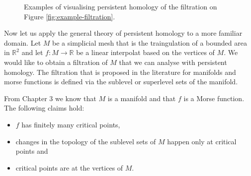 \begin{figure}[h]
    \caption{Examples of visualising persistent homology of the filtration on Figure \ref{fig:example-filtration}.}%
    \label{fig:ph-viz}%
\end{figure}


Now let us apply the general theory of persistent homology to a more familiar domain. Let $M$ be a simplicial mesh that is the traingulation of a bounded area in $\mathbb{R}^2$ and let $f: M \to \mathbb{R}$ be a linear interpolat based on the vertices of $M$. We would like to obtain a filtration of $M$ that we can analyse with persistent homology. The filtration that is proposed in the literature \cite{comp-topo} for manifolds and morse functions is defined via the sublevel or superlevel sets of the manifold.

From Chapter 3 we know that $M$ is a manifold and that $f$ is a Morse function. The following claims hold:

\begin{itemize}
    \item $f$ has finitely many critical points,
    \item changes in the topology of the sublevel sets of $M$ happen only at critical points and
    \item critical points are at the vertices of $M$.
\end{itemize}

